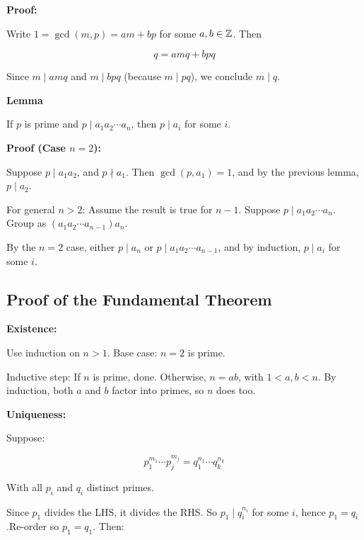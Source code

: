 \textbf{Proof:} 

Write \(1 = \gcd(m, p) = am + bp\) for some \(a, b \in \mathbb{Z}\). Then

\[
	q = amq + bpq
\]

Since \(m \mid amq\) and \(m \mid bpq\) (because \(m \mid pq\)), we conclude \(m \mid q\).

\QED

\textbf{Lemma} 

If \(p\) is prime and \(p \mid a_1a_2 \cdots a_n\), then \(p \mid a_i\) for some \(i\).
\vspace{\baselineskip}

\textbf{Proof (Case \(n=2\)):} 

Suppose \(p \mid a_1a_2\), and \(p \nmid a_1\).
Then \(\gcd(p, a_1) = 1\), and by the previous lemma, \(p \mid a_2\).
\vspace{\baselineskip}

For general \(n > 2\): Assume the result is true for \(n-1\). Suppose \(p \mid a_1a_2 \cdots a_n\).
Group as \((a_1a_2 \cdots a_{n-1})a_n\).
\vspace{\baselineskip}

By the \(n=2\) case, either \(p \mid a_n\) or \(p \mid a_1a_2 \cdots a_{n-1}\), and by induction, 
\(p \mid a_i\) for some \(i\).

\QED

\subsection{Proof of the Fundamental Theorem}

\textbf{Existence:}

Use induction on \(n > 1\). Base case: \(n = 2\) is prime.
\vspace{\baselineskip}

Inductive step: If \(n\) is prime, done. Otherwise, \(n = ab\), with \(1 < a, b < n\).
By induction, both \(a\) and \(b\) factor into primes, so \(n\) does too.
\vspace{\baselineskip}

\textbf{Uniqueness:}

Suppose:

\[
	p_1^{m_1} \cdots p_j^{m_j} = q_1^{n_1} \cdots q_k^{n_k}
\]

With all \(p_i\) and \(q_i\) distinct primes.
\vspace{\baselineskip}

Since \(p_1\) divides the LHS, it divides the RHS. So \(p_1 \mid q_i^{n_i}\) for some \(i\), hence 
\(p_1 = q_i\).Re-order so \(p_1 = q_1\). Then:

